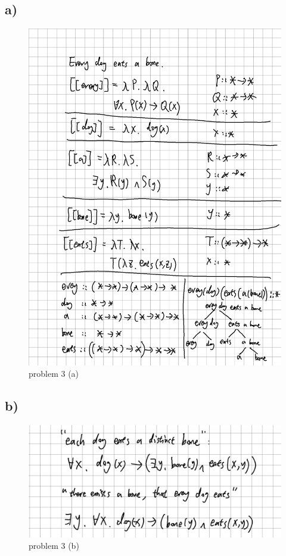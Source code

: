 \documentclass[twoside,11pt]{homework}
\begin{document}
\subsection*{a)}
  \begin{figure}[h]
  	\centering
  	\includegraphics[width=0.7\linewidth]{../parse_tree}
  	\caption{problem 3 (a)}
  	\label{fig:01}
  \end{figure}

\subsection*{b)}
  \begin{figure}[h]
  	\centering
  	\includegraphics[width=0.7\linewidth]{../disambiguation}
  	\caption{problem 3 (b)}
  	\label{fig:02}
  \end{figure}
\end{document}
